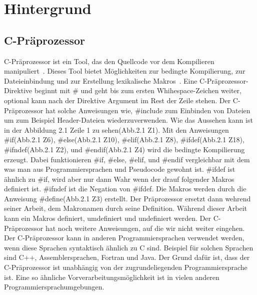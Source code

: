 \chapter{Hintergrund}
\section{C-Präprozessor}

C-Präprozessor ist ein Tool, das den Quellcode vor dem Kompilieren manipuliert~\cite{ABKS13}. Dieses Tool bietet Möglichkeiten zur bedingte Kompilierung, zur  Dateieinbindung und zur Erstellung lexikalische Makros~\cite{ABKS13}. Eine C-Präprozessor-Direktive beginnt mit \# und geht bis zum ersten Whihespace-Zeichen weiter, optional kann nach der Direktive Argument im Rest der Zeile stehen. Der C-Präprozessor hat solche Anweisungen wie, \#include zum Einbinden von Dateien um zum Beispiel Header-Dateien wiederzuverwenden. Wie das Aussehen kann ist in der Abbildung 2.1 Zeile 1 zu sehen(Abb.2.1 Z1). Mit den Anweisungen \#if(Abb.2.1 Z6), \#else(Abb.2.1 Z10), \#elif(Abb.2.1 Z8), \#ifdef(Abb.2.1 Z18), \#ifndef(Abb.2.1 Z2), und \#endif(Abb.2.1 Z4) wird die bedingte Kompilierung erzeugt. Dabei funktionieren \#if, \#else, \#elif, und \#endif vergleichbar mit dem was man aus Programmiersprachen und Pseudocode gewohnt ist. \#ifdef ist ähnlich zu \#if, wird aber nur dann Wahr wenn der drauf folgender Makros definiert ist. \#ifndef ist die Negation von \#ifdef. Die Makros werden durch die Anweisung \#define(Abb.2.1 Z3) erstellt. Der Präprozessor ersetzt dann wehrend seiner Arbeit, dem Makronamen durch seine Definition. Während dieser Arbeit kann ein Makros definiert, umdefiniert und undefiniert werden. Der C-Präprozessor hat noch weitere Anweisungen, auf die wir nicht weiter eingehen. Der C-Präprozessor kann in anderen Programmiersprachen verwendet werden, wenn diese Sprachen syntaktisch ähnlich zu C sind. Beispiel für solchen Sprachen sind C++, Assemblersprachen, Fortran und Java. Der Grund dafür ist, dass der C-Präprozessor ist unabhängig von der zugrundeliegenden Programmiersprache ist. Eine so ähnliche Vorverarbeitungsmöglichkeit ist in vielen anderen Programmiersprachumgebungen.\\



